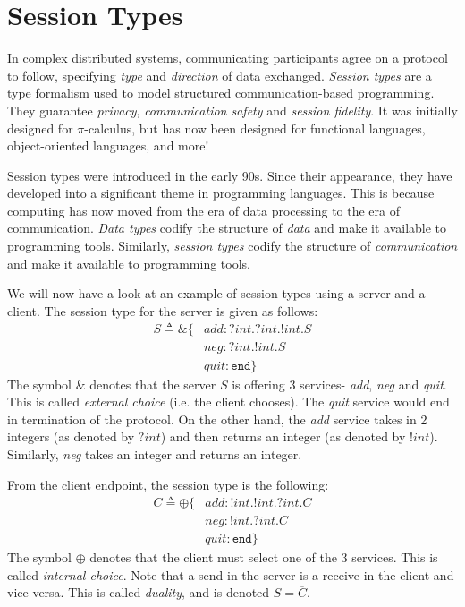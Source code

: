 \documentclass[a4paper, openany]{memoir}
\theoremstyle{definition}
\begin{document}
    \section{Session Types}
    In complex distributed systems, communicating participants agree on a protocol to follow, specifying \emph{type} and \emph{direction} of data exchanged. \emph{Session types} are a type formalism used to model structured communication-based programming. They guarantee \emph{privacy}, \emph{communication safety} and \emph{session fidelity}. It was initially designed for $\pi$-calculus, but has now been designed for functional languages, object-oriented languages, and more!

    Session types were introduced in the early 90s. Since their appearance, they have developed into a significant theme in programming languages. This is because computing has now moved from the era of data processing to the era of communication. \emph{Data types} codify the structure of \emph{data} and make it available to programming tools. Similarly, \emph{session types} codify the structure of \emph{communication} and make it available to programming tools.

    We will now have a look at an example of session types using a server and a client. The session type for the server is given as follows:
    \begin{align*}
        S \triangleq \&  \{ &\textit{add} \colon ?\textit{int}. ?\textit{int}. !\textit{int}. S \\
        & \textit{neg} \colon ?\textit{int}. !\textit{int}. S \\
        & \textit{quit} \colon \texttt{end} \}
    \end{align*}
    The symbol $\&$ denotes that the server $S$ is offering 3 services- \textit{add}, \textit{neg} and \textit{quit}. This is called \emph{external choice} (i.e. the client chooses). The \textit{quit} service would end in termination of the protocol. On the other hand, the \textit{add} service takes in 2 integers (as denoted by $?\textit{int}$) and then returns an integer (as denoted by $!\textit{int}$). Similarly, \textit{neg} takes an integer and returns an integer.

    From the client endpoint, the session type is the following:
    \begin{align*}
        C \triangleq \oplus \{ &\textit{add} \colon !\textit{int}. !\textit{int}. ?\textit{int}. C \\
        & \textit{neg} \colon !\textit{int}. ?\textit{int}. C \\
        & \textit{quit} \colon \texttt{end} \}
    \end{align*}
    The symbol $\oplus$ denotes that the client must select one of the 3 services. This is called \emph{internal choice}. Note that a send in the server is a receive in the client and vice versa. This is called \emph{duality}, and is denoted $S = \overline{C}$.
\end{document}

